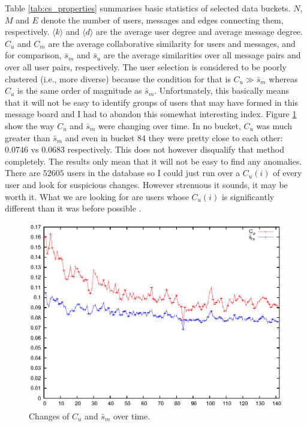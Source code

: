       Table \ref{tab:cs_properties} summarises basic statistics of selected data buckets. $N$, $M$ and $E$ denote the number of users, messages and edges connecting them, respectively. $\langle k \rangle$ and $\langle d \rangle$ are the average user degree and average message degree. $C_u$ and $C_m$ are the average collaborative similarity for users and messages, and for comparison, $\bar s_m$ and $\bar s_u$ are the average similarities over all message pairs and over all user pairs, respectively. The user selection is considered to be poorly clustered (i.e., more diverse) because the condition for that is $C_u \gg \bar s_m$ whereas $C_u$ is the same order of magnitude as $\bar s_m$. Unfortunately, this basically means that it will not be easy to identify groups of users that may have formed in this message board and I had to abandon this somewhat interesting index. Figure \ref{fig:cs_cusm} show the way $C_u$ and $\bar s_m$ were changing over time. In no bucket, $C_u$ was much greater than $\bar s_m$ and even in bucket 84 they were pretty close to each other: $0.0746$ vs $0.0683$ respectively.
      This does not however disqualify that method completely. The results only mean that it will not be easy to find any anomalies. There are $52605$ users in the database so I could just run over a $C_u(i)$ of every user and look for suspicious changes. However strenuous it sounds, it may be worth it. What we are looking for are users whose $C_u(i)$ is significantly different than it was before possible .
      \begin{figure}[H]
        \includegraphics[width=\textwidth]{chapters/03_implementation/C_us_m}
        \caption{Changes of $C_u$ and $\bar s_m$ over time.}
        \label{fig:cs_cusm}
      \end{figure}

